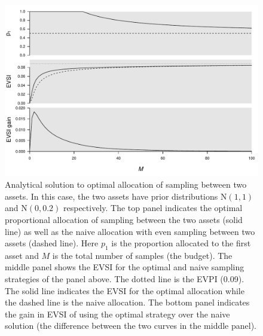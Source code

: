 \documentclass[]{article}
\theoremstyle{definition}
\theoremstyle{definition}
\theoremstyle{remark}
\begin{document}
\begin{figure}[htbp]
\centering
\includegraphics{voiConsAuc_files/figure-latex/evsi2anplot-1.pdf}
\caption{\label{fig:evsi2anplot}Analytical solution to optimal allocation of sampling
between two assets. In this case, the two assets have prior
distributions \(\mathrm{N}(1,1)\) and \(\mathrm{N}(0,0.2)\)
respectively. The top panel indicates the optimal proportional
allocation of sampling between the two assets (solid line) as well as
the naive allocation with even sampling between two assets (dashed
line). Here \(p_1\) is the proportion allocated to the first asset and
\(M\) is the total number of samples (the budget). The middle panel
shows the EVSI for the optimal and naive sampling strategies of the
panel above. The dotted line is the EVPI (0.09). The solid line
indicates the EVSI for the optimal allocation while the dashed line is
the naive allocation. The bottom panel indicates the gain in EVSI of
using the optimal strategy over the naive solution (the difference
between the two curves in the middle panel).}
\end{figure}
\end{document}
